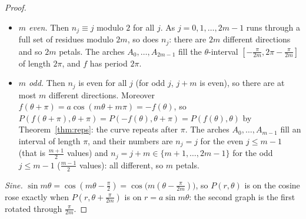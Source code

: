 \documentclass[11pt]{article}
\begin{document}
\begin{proof}
\begin{itemize}[nosep]
  \item \emph{$m$ even.} Then $n_j\equiv j$ modulo $2$ for all $j$. As $j=0,1,\dots,2m-1$ runs through a full set of residues modulo $2m$, so does $n_j$: there are $2m$ different directions and so $2m$ petals. The arches $A_0,\dots,A_{2m-1}$ fill the $\theta$-interval $\left[-\frac\pi{2m},2\pi-\frac\pi{2m}\right]$ of length $2\pi$, and $f$ has period $2\pi$.
  \item \emph{$m$ odd.} Then $n_j$ is even for all $j$ (for odd $j$, $j+m$ is even), so there are at most $m$ different directions. Moreover $f(\theta+\pi)=a\cos(m\theta+m\pi)=-f(\theta)$, so $P(f(\theta+\pi),\theta+\pi)=P(-f(\theta),\theta+\pi)=P(f(\theta),\theta)$ by Theorem~\ref{thm:reps}: the curve repeats after $\pi$. The arches $A_0,\dots,A_{m-1}$ fill an interval of length $\pi$, and their numbers are $n_j=j$ for the even $j\le m-1$ (that is $\frac{m+1}2$ values) and $n_j=j+m\in\{m+1,\dots,2m-1\}$ for the odd $j\le m-1$ ($\frac{m-1}2$ values): all different, so $m$ petals.
\end{itemize}
\emph{Sine.} $\sin m\theta=\cos\left(m\theta-\frac\pi2\right)=\cos\bigl(m(\theta-\frac\pi{2m})\bigr)$, so $P(r,\theta)$ is on the cosine rose exactly when $P\left(r,\theta+\frac\pi{2m}\right)$ is on $r=a\sin m\theta$: the second graph is the first rotated through $\frac\pi{2m}$.
\end{proof}
\end{document}
